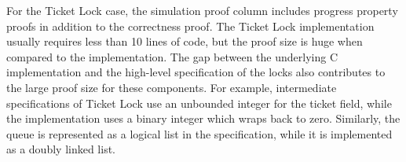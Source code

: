 For the Ticket Lock case, the simulation proof column includes progress property proofs in addition to the correctness proof. 
The Ticket Lock implementation usually requires less than 10 lines of code, but the proof size is huge when compared to the implementation.
The gap between the underlying C implementation and the high-level specification of the locks also contributes to the large proof size for these components. For example, intermediate specifications of Ticket Lock use an unbounded integer for the ticket field, while the implementation uses a binary integer which wraps back to zero. Similarly, the queue is represented as a logical list in the specification, while it is implemented as a doubly linked list.

